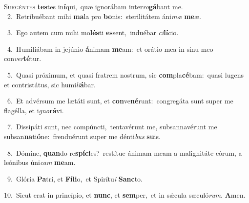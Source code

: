 \lettrine{\initial\textcolor{\initialcolor}{S}}{urgéntes} \textbf{tes}\-tes in\-\textbf{í}\-qui,~\star quæ ignorábam inter\-\textit{ro}\-\textbf{gá}bant me.\\
{\numbfont\textcolor{\numbcolor}{~2.}}~Retribuébant mihi \textbf{ma}\-la pro \textbf{bo}\-nis:~\star sterilitátem áni\textit{mæ} \textbf{me}\-æ.\par
{\numbfont\textcolor{\numbcolor}{~3.}}~Ego autem cum mihi mo\-\textbf{lés}\-ti \textbf{es}\-sent,~\star induébar \textit{ci}\-\textbf{lí}cio.\par
{\numbfont\textcolor{\numbcolor}{~4.}}~Humiliábam in jejúnio \textbf{á}\-nimam \textbf{me}\-am:~\star et orátio mea in sinu meo con\-\textit{ver}\-\textbf{té}tur.\par
{\numbfont\textcolor{\numbcolor}{~5.}}~Quasi próximum, et quasi fratrem nostrum, sic \textbf{com}\-pla\-\textbf{cé}\-bam:~\star quasi lugens et contristátus, sic humi\-\textit{li}\-\textbf{á}bar.\par
{\numbfont\textcolor{\numbcolor}{~6.}}~Et advérsum me lætáti sunt, et \textbf{con}\-ve\-\textbf{né}\-runt:~\star congregáta sunt super me flagélla, et i\-\textit{gno}\-\textbf{rá}vi.\par
{\numbfont\textcolor{\numbcolor}{~7.}}~Dissipáti sunt, nec compúncti,~\dagger tentavérunt me, subsannavérunt me subsan\-\textbf{na}\-ti\-\textbf{ó}\-ne:~\star frenduérunt super me dénti\textit{bus} \textbf{su}\-is.\par
{\numbfont\textcolor{\numbcolor}{~8.}}~Dómine, \textbf{quan}\-do re\-\textbf{spí}\-\textbf{ci}es?~\star restítue ánimam meam a malignitáte eórum, a leónibus úni\textit{cam} \textbf{me}\-am.\par
{\numbfont\textcolor{\numbcolor}{~9.}}~Glória \textbf{Pa}\-tri, et \textbf{Fí}\-\textbf{li}o,~\star et Spirítu\textit{i} \textbf{Sanc}\-to.\par
{\numbfont\textcolor{\numbcolor}{10.}}~Sicut erat in princípio, et \textbf{nunc}\-, et \textbf{sem}\-per,~\star et in sǽcula sæculó\-\textit{rum}\-. \textbf{A}\-men.\par

